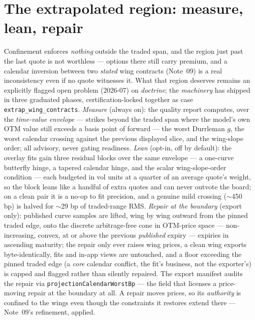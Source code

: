 \documentclass[11pt]{article}
\begin{document}
\section{The extrapolated region: measure, lean, repair}
\label{sec:extrap}

Confinement enforces \emph{nothing} outside the traded span, and the
region just past the last quote is not worthless --- options there
still carry premium, and a calendar inversion between two \emph{stated}
wing contracts (Note~09) is a real inconsistency even if no quote
witnesses it.  What that region deserves remains an explicitly flagged
open problem (2026-07) on \emph{doctrine}; the \emph{machinery} has
shipped in three graduated phases, certification-locked together as case
\texttt{extrap\_wing\_contracts}.  \emph{Measure} (always on): the quality report
computes, over the \emph{time-value envelope} --- strikes beyond the
traded span where the model's own OTM value still exceeds a basis point
of forward --- the worst Durrleman $g$, the worst calendar crossing
against the previous displayed slice, and the wing-slope order; all
advisory, never gating readiness.  \emph{Lean} (opt-in, off by
default): the overlay fits gain three residual blocks over the same
envelope --- a one-curve butterfly hinge, a tapered calendar hinge, and
the scalar wing-slope-order condition --- each budgeted in vol units at
a quarter of an average quote's weight, so the block leans like a
handful of extra quotes and can never outvote the board; on a clean
pair it is a no-op to fit precision, and a genuine mild crossing
($\sim$450 bp) is halved for $\sim$29 bp of traded-range RMS.
\emph{Repair at the boundary} (export only): published curve samples
are lifted, wing by wing outward from the pinned traded edge, onto the
discrete arbitrage-free cone in OTM-price space --- non-increasing,
convex, at or above the previous \emph{published} expiry --- expiries
in ascending maturity; the repair only ever raises wing prices, a clean
wing exports byte-identically, fits and in-app views are untouched, and
a floor exceeding the pinned traded edge (a \emph{core} calendar
conflict, the fit's business, not the exporter's) is capped and flagged
rather than silently repaired.  The export manifest audits the repair
via \texttt{projectionCalendarWorstBp} --- the field that licenses a
price-moving repair at the boundary at all.  A repair moves prices, so
its \emph{authority} is confined to the wings even though the constraints
it restores extend there --- Note~09's refinement, applied.
\end{document}
